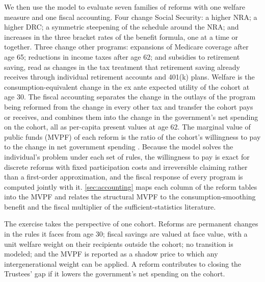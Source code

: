 We then use the model to evaluate seven families of reforms with one welfare measure and one fiscal accounting. Four change Social Security: a higher NRA; a higher DRC; a symmetric steepening of the schedule around the NRA; and increases in the three bracket rates of the benefit formula, one at a time or together. Three change other programs: expansions of Medicare coverage after age 65; reductions in income taxes after age 62; and subsidies to retirement saving, read as changes in the tax treatment that retirement saving already receives through individual retirement accounts and 401(k) plans. %
Welfare is the consumption-equivalent change in the ex ante expected utility of the cohort at age 30. The fiscal accounting separates the change in the outlays of the program being reformed from the change in every other tax and transfer the cohort pays or receives, and combines them into the change in the government's net spending on the cohort, all as per-capita present values at age 62. The marginal value of public funds (MVPF) of each reform is the ratio of the cohort's willingness to pay to the change in net government spending \citep{hendren2020unified}. Because the model solves the individual's problem under each set of rules, the willingness to pay is exact for discrete reforms with fixed participation costs and irreversible claiming rather than a first-order approximation, and the fiscal response of every program is computed jointly with it. \autoref{sec:accounting} maps each column of the reform tables into the MVPF and relates the structural MVPF to the consumption-smoothing benefit and the fiscal multiplier of the sufficient-statistics literature.

The exercise takes the perspective of one cohort. Reforms are permanent changes in the rules it faces from age 30; fiscal savings are valued at face value, with a unit welfare weight on their recipients outside the cohort; no transition is modeled; and the MVPF is reported as a shadow price to which any intergenerational weight can be applied. A reform contributes to closing the Trustees' gap if it lowers the government's net spending on the cohort.

